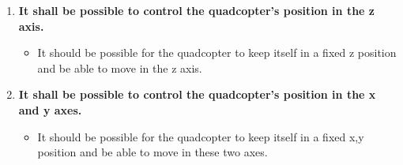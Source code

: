 \begin{enumerate}[label=\textbf{\arabic*})]
\item \textbf{It shall be possible to control the quadcopter's position in the z axis.}
\begin{itemize}
\item[] It should be possible for the quadcopter to keep itself in a fixed z position and be able to move in the z axis. 
\end{itemize}

\item \textbf{It shall be possible to control the quadcopter's position in the x and y axes.}
\begin{itemize}
\item[] It should be possible for the quadcopter to keep itself in a fixed x,y position and be able to move in these two axes. 
\end{itemize}

\end{enumerate}



























